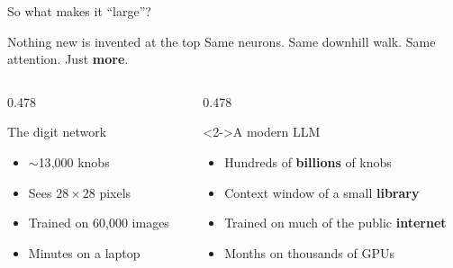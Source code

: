 \documentclass[aspectratio=169,11pt]{beamer}
\begin{document}
\begin{frame}{So what makes it ``large''?}
  \begin{block}{Nothing new is invented at the top}
    Same neurons. Same downhill walk. Same attention. Just \textbf{more}.
  \end{block}
  \medskip
  \begin{columns}[T,onlytextwidth]
    \begin{column}{0.478\textwidth}
      \begin{block}{The digit network}
        \small
        \begin{itemize}
          \item $\sim$13{,}000 knobs
          \item Sees $28\times28$ pixels
          \item Trained on 60{,}000 images
          \item Minutes on a laptop
        \end{itemize}
      \end{block}
    \end{column}
    \begin{column}{0.478\textwidth}
      \begin{exampleblock}<2->{A modern LLM}
        \small
        \begin{itemize}
          \item Hundreds of \textbf{billions} of knobs
          \item Context window of a small \textbf{library}
          \item Trained on much of the public \textbf{internet}
          \item Months on thousands of GPUs
        \end{itemize}
      \end{exampleblock}
    \end{column}
  \end{columns}
  \medskip
  \begin{center}
  \end{center}
\end{frame}
\end{document}
